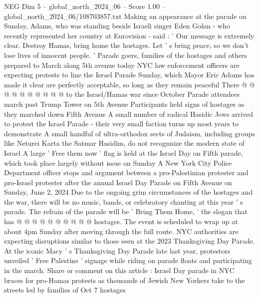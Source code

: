 \begin{textsample}{NEG Dim 5 – global\_north\_2024\_06 – Score 1.00 – global\_north\_2024\_06/108703857.txt}
Making an appearance at the parade on Sunday, Adams, who was standing beside Israeli singer Eden Golan - who recently represented her country at Eurovision - said : ' Our message is extremely clear.
Destroy Hamas, bring home the hostages.
Let ' s bring peace, so we don't lose lives of innocent people. ' Parade goers, families of the hostages and others prepared to March along 5th avenue today NYC law enforcement officers are expecting protests to line the Israel Parade Sunday, which Mayor Eric Adams has made it clear are perfectly acceptable, so long as they remain peaceful There @ @ @ @ @ @ @ @ @ @ to the Israel/Hamas war since October Parade attendees march past Trump Tower on 5th Avenue Participants held signs of hostages as they marched down Fifth Avenue A small number of radical Hasidic Jews arrived to protest the Israel Parade - their very small faction turns up most years to demonstrate A small handful of ultra-orthodox sects of Judaism, including groups like Neturei Karta the Satmar Hasidim, do not recognnize the modern state of Israel A large ' Free them now ' flag is held at the Israel Day on Fifth parade, which took place largely without issue on Sunday A New York City Police Department officer stops and argument between a pro-Palestinian protester and pro-Israel protester after the annual Israel Day Parade on Fifth Avenue on Sunday, June 2, 2024 Due to the ongoing grim circumstances of the hostages and the war, there will be no music, bands, or celebratory chanting at this year ' s parade.
The refrain of the parade will be ' Bring Them Home, ' the slogan that has @ @ @ @ @ @ @ @ @ @ hostages.
The event is scheduled to wrap up at about 4pm Sunday after moving through the full route.
NYC authorities are expecting disruptions similar to those seen at the 2023 Thanksgiving Day Parade.
At the iconic Macy ' s Thanksgiving Day Parade late last year, protestors unveiled ' Free Palestine ' signage while riding on parade floats and participating in the march.
Share or comment on this article : Israel Day parade in NYC braces for pro-Hamas protests as thousands of Jewish New Yorkers take to the streets led by families of Oct 7 hostages

\end{textsample}
